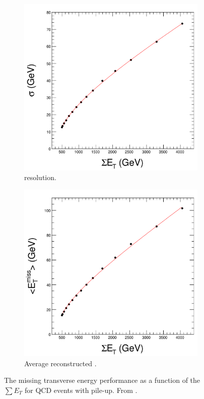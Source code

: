 \begin{figure}[htbp]
  \centering
  \begin{subfigure}{0.48\textwidth}
    \centering
    \includegraphics[width=\textwidth]{met_res}
    \caption{\ETm resolution.}
    \label{fig:met_res}
  \end{subfigure}
  \begin{subfigure}{0.48\textwidth}
    \centering
    \includegraphics[width=\textwidth]{met_mean}
    \caption{Average reconstructed \ETm.}
    \label{fig:met_mean}
  \end{subfigure}
  \caption[The missing transverse energy performance as a function of the $\sum
E_T$ for QCD events.] { The missing transverse energy performance as a function
of the $\sum E_T$ for QCD events with pile-up. From \cite{chatrchyan2008cms}. }
  \label{fig:met_performance} 
\end{figure}

